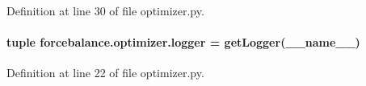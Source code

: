 Definition at line 30 of file optimizer.\-py.

\hypertarget{namespaceforcebalance_1_1optimizer_a8c7d22696df2debf02ce9e3bb35349fd}{
\paragraph[{logger}]{\setlength{\rightskip}{0pt plus 5cm}tuple forcebalance.\-optimizer.\-logger = get\-Logger(\-\_\-\-\_\-name\-\_\-\-\_\-)}}\label{namespaceforcebalance_1_1optimizer_a8c7d22696df2debf02ce9e3bb35349fd}


Definition at line 22 of file optimizer.\-py.

